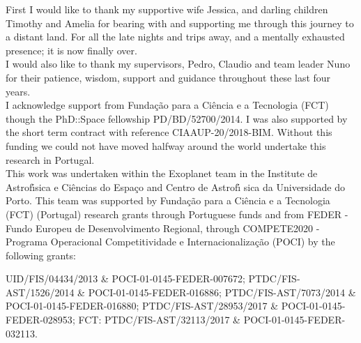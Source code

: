 
\begin{acknowledgements}
    \label{preface:acknowledgements}
    First I would like to thank my supportive wife Jessica, and darling children Timothy and Amelia for bearing with and supporting me through this journey to a distant land.
    For all the late nights and trips away, and a mentally exhausted presence; it is now finally over.\\
    
    I would also like to thank my supervisors, Pedro, Claudio and team leader Nuno for their patience, wisdom, support and guidance throughout these last four years.\\
    
    I acknowledge support from Funda\c{c}\~{a}o para a Ci\^encia e a Tecnologia (FCT) though the PhD::Space fellowship {PD/BD/52700/2014}.
    I was also supported by the short term contract with reference {CIAAUP-20/2018-BIM}.
    Without this funding we could not have moved halfway around the world undertake this research in Portugal.\\
    
    This work was undertaken within the Exoplanet team in the Institute de Astrof\'{\i}sica e Ci\^encias do Espa\c{c}o and Centro de Astrof\'{\i} sica da Universidade do Porto.
    This team was supported by Funda\c{c}\~ao para a Ci\^{e}ncia e a Tecnologia (FCT) (Portugal) research grants through Portuguese funds and from {FEDER} - Fundo Europeu de Desenvolvimento Regional, through {COMPETE2020} - Programa Operacional Competitividade e Internacionaliza\c{c}\~{a}o ({POCI}) by the following grants:

    {UID/FIS/04434/2013} \& {POCI-01-0145-FEDER-007672};
    {PTDC/FIS-AST/1526/2014} \& {POCI-01-0145-FEDER-016886};
    {PTDC/FIS-AST/7073/2014} \& {POCI-01-0145-FEDER-016880};
    {PTDC/FIS-AST/28953/2017} \& {POCI-01-0145-FEDER-028953};
    {FCT: PTDC/FIS-AST/32113/2017} \& {POCI-01-0145-FEDER-032113}.

\end{acknowledgements}

